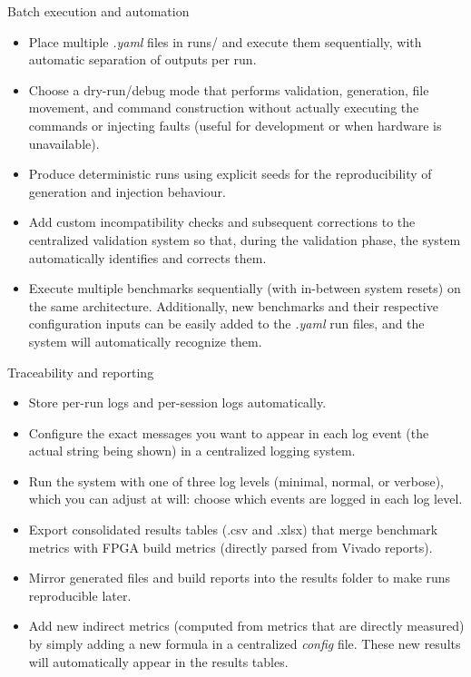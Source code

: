  Batch execution and automation
\begin{itemize}
    \item Place multiple \textit{.yaml} files in runs/ and execute them sequentially, with automatic separation of outputs per run.
    \item Choose a dry-run/debug mode that performs validation, generation, file movement, and command construction without actually executing the commands or injecting faults (useful for development or when hardware is unavailable).
    \item Produce deterministic runs using explicit seeds for the reproducibility of generation and injection behaviour.
    \item Add custom incompatibility checks and subsequent corrections to the centralized validation system so that, during the validation phase, the system automatically identifies and corrects them.
    \item Execute multiple benchmarks sequentially (with in-between system resets) on the same architecture. Additionally, new benchmarks and their respective configuration inputs can be easily added to the \textit{.yaml} run files, and the system will automatically recognize them.
\end{itemize}

 Traceability and reporting
\begin{itemize}
    \item Store per-run logs and per-session logs automatically.
    \item Configure the exact messages you want to appear in each log event (the actual string being shown) in a centralized logging system.
    \item Run the system with one of three log levels (minimal, normal, or verbose), which you can adjust at will: choose which events are logged in each log level.
    \item Export consolidated results tables (.csv and .xlsx) that merge benchmark metrics with FPGA build metrics (directly parsed from Vivado reports).
    \item Mirror generated files and build reports into the results folder to make runs reproducible later.
    \item Add new indirect metrics (computed from metrics that are directly measured) by simply adding a new formula in a centralized \textit{config} file. These new results will automatically appear in the results tables.
\end{itemize}


